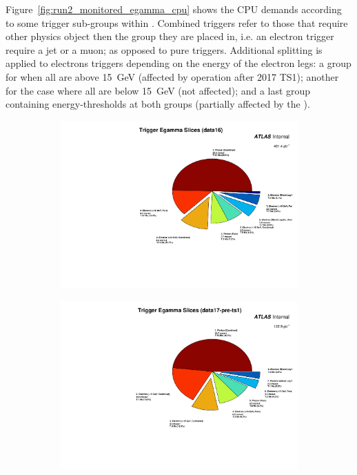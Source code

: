 Figure~\ref{fig:run2_monitored_egamma_cpu} shows the CPU demands according to
some trigger sub-groups within \egamma{}. Combined triggers refer to those that
require other physics object then the group they are placed in, i.e. an electron
trigger require a jet or a muon; as opposed to pure triggers. Additional
splitting is applied to electrons triggers depending on the energy of the
electron legs: a group for when all are above \SI{15}{\GeV} (affected by \rnn
operation after 2017 TS1); another for the case where all are below
\SI{15}{\GeV} (not affected); and a last group containing energy-thresholds at
both groups (partially affected by the \rnn).

\begin{figure}[h!tb]
\centering
\begin{subfigure}[c]{.48\textwidth}
  \includegraphics[width=\textwidth]{appendices/figures/menu_cpu_measurements/run2_slice_cpu_egamma_pie_data16.pdf}
\caption{}%
\label{fig:run2_monitored_egamma_cpu_data16}
\end{subfigure}
\hfill
\begin{subfigure}[c]{.48\textwidth}
  \includegraphics[width=\textwidth]{appendices/figures/menu_cpu_measurements/run2_slice_cpu_egamma_pie_data17-pre-ts1.pdf}

\end{subfigure}
\end{figure}
